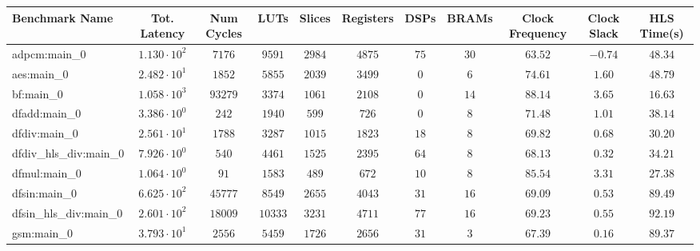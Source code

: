 \begin{tabular}{|l|c|c|c|c|c|c|c|c|c|c|}
\hline
Benchmark Name          & Tot. Latency           & Num Cycles & LUTs      & Slices    & Registers & DSPs    & BRAMs   & Clock Frequency & Clock Slack & HLS Time(s) \\
\hline
adpcm:main\_0           & $ 1.130 \cdot 10^{2} $ & $ 7176   $ & $ 9591  $ & $ 2984  $ & $ 4875  $ & $ 75  $ & $ 30  $ & $ 63.52       $ & $ -0.74   $ & $ 48.34   $ \\
aes:main\_0             & $ 2.482 \cdot 10^{1} $ & $ 1852   $ & $ 5855  $ & $ 2039  $ & $ 3499  $ & $ 0   $ & $ 6   $ & $ 74.61       $ & $ 1.60    $ & $ 48.79   $ \\
bf:main\_0              & $ 1.058 \cdot 10^{3} $ & $ 93279  $ & $ 3374  $ & $ 1061  $ & $ 2108  $ & $ 0   $ & $ 14  $ & $ 88.14       $ & $ 3.65    $ & $ 16.63   $ \\
dfadd:main\_0           & $ 3.386 \cdot 10^{0} $ & $ 242    $ & $ 1940  $ & $ 599   $ & $ 726   $ & $ 0   $ & $ 8   $ & $ 71.48       $ & $ 1.01    $ & $ 38.14   $ \\
dfdiv:main\_0           & $ 2.561 \cdot 10^{1} $ & $ 1788   $ & $ 3287  $ & $ 1015  $ & $ 1823  $ & $ 18  $ & $ 8   $ & $ 69.82       $ & $ 0.68    $ & $ 30.20   $ \\
dfdiv\_hls\_div:main\_0 & $ 7.926 \cdot 10^{0} $ & $ 540    $ & $ 4461  $ & $ 1525  $ & $ 2395  $ & $ 64  $ & $ 8   $ & $ 68.13       $ & $ 0.32    $ & $ 34.21   $ \\
dfmul:main\_0           & $ 1.064 \cdot 10^{0} $ & $ 91     $ & $ 1583  $ & $ 489   $ & $ 672   $ & $ 10  $ & $ 8   $ & $ 85.54       $ & $ 3.31    $ & $ 27.38   $ \\
dfsin:main\_0           & $ 6.625 \cdot 10^{2} $ & $ 45777  $ & $ 8549  $ & $ 2655  $ & $ 4043  $ & $ 31  $ & $ 16  $ & $ 69.09       $ & $ 0.53    $ & $ 89.49   $ \\
dfsin\_hls\_div:main\_0 & $ 2.601 \cdot 10^{2} $ & $ 18009  $ & $ 10333 $ & $ 3231  $ & $ 4711  $ & $ 77  $ & $ 16  $ & $ 69.23       $ & $ 0.55    $ & $ 92.19   $ \\
gsm:main\_0             & $ 3.793 \cdot 10^{1} $ & $ 2556   $ & $ 5459  $ & $ 1726  $ & $ 2656  $ & $ 31  $ & $ 3   $ & $ 67.39       $ & $ 0.16    $ & $ 89.37   $ \\

\end{tabular}
